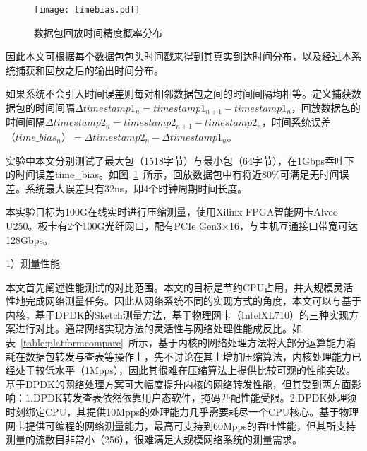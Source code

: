 \begin{figure}[!ht]
	\centering 
	\vspace{3.5mm} 
	\texttt{[image: timebias.pdf]}
	\caption{数据包回放时间精度概率分布} \label{fig:timebias}
\end{figure}

因此本文可根据每个数据包包头时间戳来得到其真实到达时间分布，以及经过本系统捕获和回放之后的输出时间分布。

如果系统不会引入时间误差则每对相邻数据包之间的时间间隔均相等。定义捕获数据包的时间间隔$ \Delta timestamp1_n = timestamp1_{n+1} - timestamp1_{n} $，回放数据包的时间间隔$ \Delta timestamp2_n = timestamp2_{n+1} - timestamp2_{n} $，时间系统误差$ （time\_bias_n）=\Delta timestamp2_n - \Delta timestamp1_n $。



实验中本文分别测试了最大包（1518字节）与最小包（64字节），在1Gbps吞吐下的时间误差time\_bias。如图~\ref{fig:timebias}~所示，回放数据包中有将近80\%可满足无时间误差。系统最大误差只有32ns，即4个时钟周期时间长度。


\label{chap372}

本实验目标为100G在线实时进行压缩测量，使用Xilinx FPGA智能网卡Alveo U250。板卡有2个100G光纤网口，配有PCIe Gen3$ \times $16，与主机互通接口带宽可达128Gbps。

1）测量性能

本文首先阐述性能测试的对比范围。本文的目标是节约CPU占用，并大规模灵活性地完成网络测量任务。因此从网络系统不同的实现方式的角度，本文可以与基于内核，基于DPDK的Sketch测量方法，基于物理网卡（IntelXL710）的三种实现方案进行对比。通常网络实现方法的灵活性与网络处理性能成反比。如表~\ref{table:platformcompare}~所示，基于内核的网络处理方法将大部分运算能力消耗在数据包转发与查表等操作上，先不讨论在其上增加压缩算法，内核处理能力已经处于较低水平（1Mpps），因此其很难在压缩算法上提供比较可观的性能突破。基于DPDK的网络处理方案可大幅度提升内核的网络转发性能，但其受到两方面影响：1.DPDK转发查表依然依靠用户态软件，掩码匹配性能受限。2.DPDK处理须时刻绑定CPU，其提供10Mpps的处理能力几乎需要耗尽一个CPU核心。基于物理网卡提供可编程的网络测量能力，最高可支持到60Mpps的吞吐性能，但其所支持测量的流数目非常小（256），很难满足大规模网络系统的测量需求。



